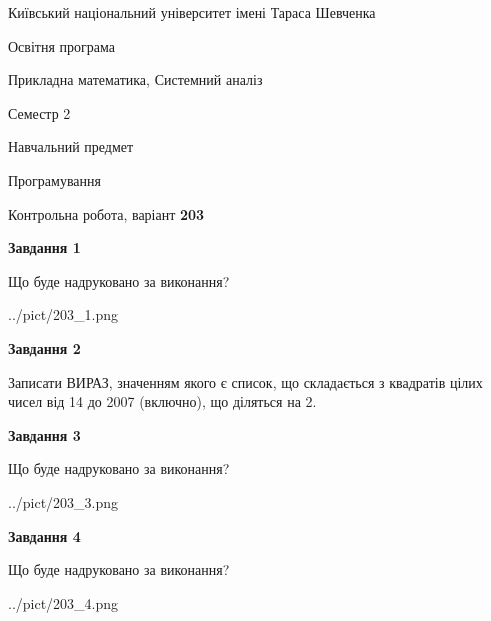 \documentclass[12pt, ukrainian]{article}
\begin{document}
{{\begin {small}\par
{ \center  Київський національний університет імені Тараса Шевченка \par}
{\parbox {5 cm}{Освітня програма \hfill}{\parbox {8 cm}{Прикладна математика, Системний аналіз \hfill}}\parbox {5 cm}{\hfill Семестр 2}}\par
{\parbox {5 cm} {Навчальний предмет \hfill}\parbox {7 cm}{Програмування \hfill}\parbox {6cm}{\hfill}\par}\vspace{-7pt} \end{small}}{\center Контрольна робота, варіант  \No \textbf
{ 203 }\par}}
{
\begin {large}
{\begin {center}\textbf{Завдання 1}\end {center}}\par
Що буде надруковано за виконання?\par\par
\begin{center}
	{../pict/203_1.png}
\end{center}
\newpage

{\begin {center}\textbf{Завдання 2}\end {center}}\par

Записати ВИРАЗ, значенням якого є список, що складається з квадратів цілих чисел від 14 до 2007 (включно), що діляться на 2.\par
\newpage

{\begin {center}\textbf{Завдання 3}\end {center}}\par
Що буде надруковано за виконання?\par
\begin{center}
	{../pict/203_3.png}
\end{center}
\newpage

{\begin {center}\textbf{Завдання 4}\end {center}}\par
Що буде надруковано за виконання?\par
\begin{center}
	{../pict/203_4.png}
\end{center}
\newpage


\end{large}}
\end{document}
